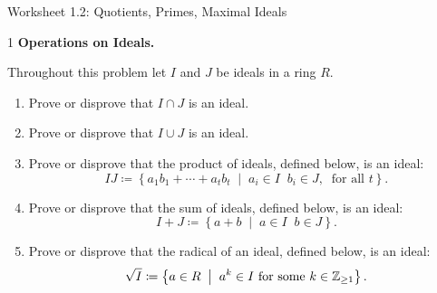 \documentclass[Notebook.tex]{subfiles}
\begin{document}
\ifSubfilesClassLoaded{
    
}{}

\begin{center}
	{Worksheet 1.2: Quotients, Primes, Maximal Ideals}
\end{center}

\begin{problem}{1} 
    \textbf{Operations on Ideals.} 
    
    Throughout this problem let $I$ and $J$ be ideals in a ring $R$.
    \begin{enumerate}[label=(\alph*),ref=\theenumi\alph*]
		\item Prove or disprove that $I \cap J$ is an ideal. 
		\item Prove or disprove that $I \cup J$ is an ideal.
		\item Prove or disprove that the product of ideals, defined below, is an ideal:
		\[
		IJ \coloneqq \left\{ a_1b_1+\cdots+a_tb_t\;\; \big| \;\; a_i\in I\;\; b_i \in J, \; \; \text{for all $t$}\right\}.
		\]
		\item Prove or disprove that the sum of ideals, defined below, is an ideal:
		\[
		I + J \coloneqq \left\{ a + b \;\; \big| \;\; a \in I\;\; b \in J\right\}.
		\]
		\item Prove or disprove that the radical of an ideal, defined below, is an ideal:
		\[
		\sqrt{I} \coloneqq \left\{ a \in R \;\; \big| \;\; a^{k} \in I \text{ for some $k\in \mathbb Z_{\geq1}$} \right\}.
		\]
	\end{enumerate}
\end{problem}
\end{document}
